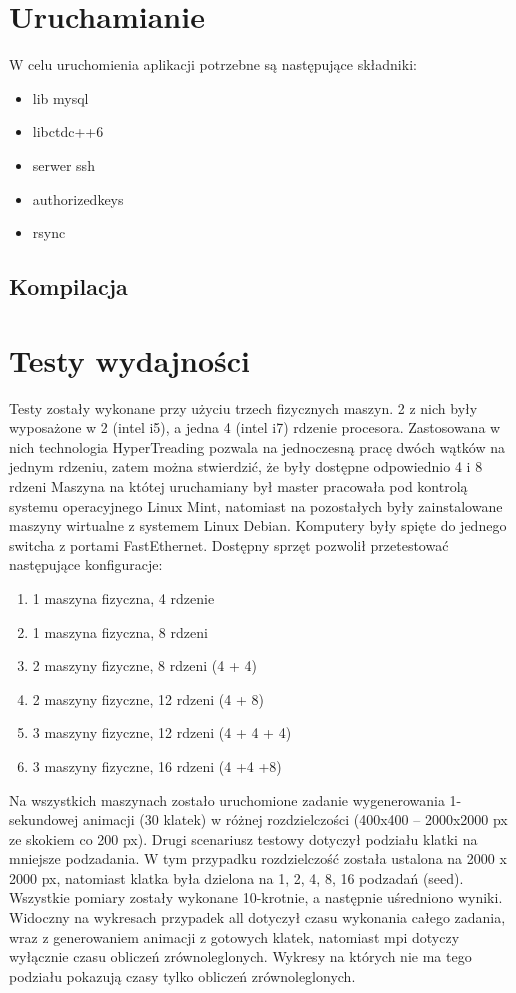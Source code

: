 \documentclass[a4paper]{article}
\begin{document}
\section{Uruchamianie}
W celu uruchomienia aplikacji potrzebne są następujące składniki:
\begin{itemize}
\item lib mysql
\item libctdc++6
\item serwer ssh
\item authorizedkeys
\item rsync
\end{itemize}

\subsection{Kompilacja}

\section{Testy wydajności}
Testy zostały wykonane przy użyciu trzech fizycznych maszyn. 2 z nich były wyposażone w 2 (intel i5), a jedna 4 (intel i7) rdzenie procesora. Zastosowana w nich technologia HyperTreading pozwala na jednoczesną pracę dwóch wątków na jednym rdzeniu, zatem można stwierdzić, że były dostępne odpowiednio 4 i 8 rdzeni Maszyna na któtej uruchamiany był master pracowała pod kontrolą systemu operacyjnego Linux Mint, natomiast na pozostałych były zainstalowane maszyny wirtualne z systemem Linux Debian. Komputery były spięte do jednego switcha z portami FastEthernet. Dostępny sprzęt pozwolił przetestować następujące konfiguracje:
\begin{enumerate}
\item 1 maszyna fizyczna, 4 rdzenie
\item 1 maszyna fizyczna, 8 rdzeni
\item 2 maszyny fizyczne, 8 rdzeni (4 + 4)
\item 2 maszyny fizyczne, 12 rdzeni (4 + 8)
\item 3 maszyny fizyczne, 12 rdzeni (4 + 4 + 4)
\item 3 maszyny fizyczne, 16 rdzeni (4 +4 +8)
\end{enumerate}

Na wszystkich maszynach zostało uruchomione zadanie wygenerowania 1-sekundowej animacji (30 klatek) w różnej rozdzielczości (400x400 – 2000x2000 px ze skokiem co 200 px). Drugi scenariusz testowy dotyczył podziału klatki na mniejsze podzadania. W tym przypadku rozdzielczość została ustalona na 2000 x 2000 px, natomiast klatka była dzielona na 1, 2, 4, 8, 16 podzadań (seed). Wszystkie pomiary zostały wykonane 10-krotnie, a następnie uśredniono wyniki. Widoczny na wykresach przypadek all dotyczył czasu wykonania całego zadania, wraz z generowaniem animacji z gotowych klatek, natomiast mpi dotyczy wyłącznie czasu obliczeń zrównoleglonych. Wykresy na których nie ma tego podziału pokazują czasy tylko obliczeń zrównoleglonych.
\end{document}
